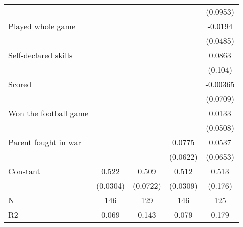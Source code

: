 {\begin{tabular}{l*{4}{c}}
                    &                     &                     &                     &    (0.0953)         \\
[1em]
Played whole game   &                     &                     &                     &     -0.0194         \\
                    &                     &                     &                     &    (0.0485)         \\
[1em]
Self-declared skills&                     &                     &                     &      0.0863         \\
                    &                     &                     &                     &     (0.104)         \\
[1em]
Scored              &                     &                     &                     &    -0.00365         \\
                    &                     &                     &                     &    (0.0709)         \\
[1em]
Won the football game&                     &                     &                     &      0.0133         \\
                    &                     &                     &                     &    (0.0508)         \\
[1em]
Parent fought in war&                     &                     &      0.0775         &      0.0537         \\
                    &                     &                     &    (0.0622)         &    (0.0653)         \\
[1em]
Constant            &       0.522\sym{***}&       0.509\sym{***}&       0.512\sym{***}&       0.513\sym{***}\\
                    &    (0.0304)         &    (0.0722)         &    (0.0309)         &     (0.176)         \\
\hline
N                   &         146         &         129         &         146         &         125         \\
R2                  &       0.069         &       0.143         &       0.079         &       0.179         \\
\hline\hline
\end{tabular}
}
